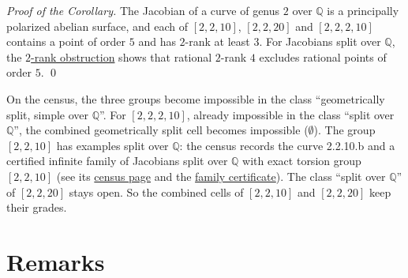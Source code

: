 \documentclass[11pt]{article}
\newcommand{\Q}{\mathbb Q}
\begin{document}
\medskip
\emph{Proof of the Corollary.} The Jacobian of a curve of genus \(2\) over \(\Q\) is a principally
polarized abelian surface, and each of \([2,2,10]\), \([2,2,20]\) and \([2,2,2,10]\) contains a
point of order \(5\) and has \(2\)-rank at least \(3\). For Jacobians split over \(\Q\), the
\href{https://genus-2-torsion.github.io/proofs/qsplit-two-rank-obstruction.html}{\(2\)-rank
obstruction} shows that rational \(2\)-rank \(4\) excludes rational points of order \(5\). \qed

\medskip
On the census, the three groups become impossible in the class ``geometrically split, simple
over \(\Q\)''. For \([2,2,2,10]\), already impossible in the class ``split over \(\Q\)'', the
combined geometrically split cell becomes impossible (\(\emptyset\)). The group \([2,2,10]\) has
examples split over \(\Q\): the census records the curve 2.2.10.b and a certified infinite family
of Jacobians split over \(\Q\) with exact torsion group \([2,2,10]\) (see its
\href{https://genus-2-torsion.github.io/group.html?g=2.2.10}{census page} and the
\href{https://genus-2-torsion.github.io/data/knowledge/sources/family_2210_split_certificate.log}{family
certificate}). The class ``split over \(\Q\)'' of \([2,2,20]\) stays open. So the combined cells
of \([2,2,10]\) and \([2,2,20]\) keep their grades.

\section{Remarks}\label{remarks}
\end{document}
